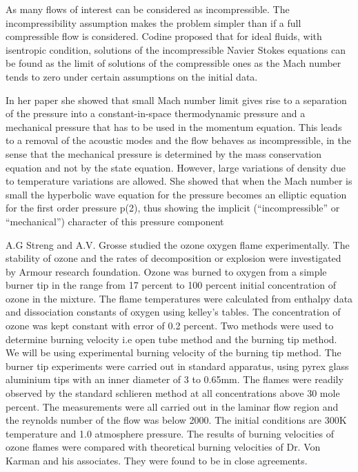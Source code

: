 \bigskip
\noindent As many flows of interest can be considered as incompressible. The incompressibility assumption makes the problem simpler than if a full compressible flow is considered. Codine  proposed that for ideal fluids, with isentropic condition, solutions of the incompressible Navier Stokes equations can be found as the limit of solutions of the compressible ones as the Mach number tends to zero under certain assumptions on the initial data.

\noindent In her paper she showed that small Mach number limit gives rise to a separation of the pressure into a constant-in-space thermodynamic pressure and a mechanical pressure that has to be used in the momentum equation. This leads to a removal of the acoustic modes and the flow behaves as incompressible, in the sense that the mechanical pressure is determined by the mass conservation
equation and not by the state equation. However, large variations of density
due to temperature variations are allowed. She showed that when the Mach number is small the hyperbolic wave equation for the pressure becomes an elliptic
equation for the first order pressure p(2), thus showing the implicit (“incompressible” or “mechanical”) character of this pressure component

\bigskip
\noindent A.G Streng and A.V. Grosse  studied the ozone oxygen flame experimentally. The stability of ozone and the rates of decomposition or explosion were investigated by Armour research foundation. Ozone was burned to oxygen from a simple burner tip in the range from 17 percent to 100 percent initial concentration of ozone in the mixture. The flame temperatures were calculated from enthalpy data and dissociation constants of oxygen using kelley's tables. The concentration of ozone was kept constant with error of   0.2 percent. Two methods were used to determine burning velocity i.e open tube method and the burning tip method. We will be using experimental burning velocity of the burning tip method. The burner tip experiments were carried out in standard apparatus, using pyrex glass aluminium tips with an inner diameter of 3 to 0.65mm. The flames were readily observed by the standard schlieren method at all concentrations above 30 mole percent. The measurements were all carried out in the laminar flow region and the reynolds number of the flow was below 2000. The initial conditions are 300K temperature and 1.0 atmosphere pressure. The results of burning velocities of ozone flames were compared with theoretical burning velocities of Dr. Von Karman and his associates. They were found to be in close agreements. 
